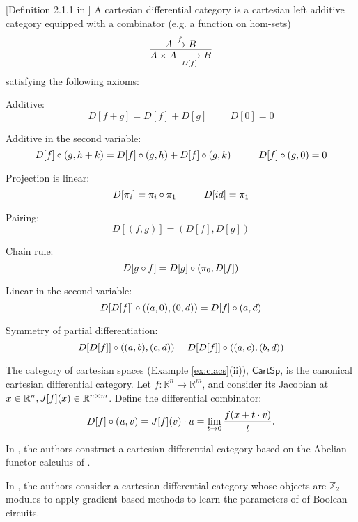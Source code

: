 \begin{definition}\label{def:cdc}[Definition 2.1.1 in \cite{Blute2009}]
    A cartesian differential category is a cartesian left additive category equipped with a combinator (e.g. a function on hom-sets)
    \[
        \infer{A \x A \xrightarrow[{D[f]}]{} B}{A \xrightarrow{f} B}
    \]
    satisfying the following axioms:
  \begin{enumerate}[{[CD.1]}]
      \item Additive:
        \[D[f+g] = D[f] + D[g] \hspace{1cm} D[0] = 0\]
      \item Additive in the second variable:
        \[D[f] \circ (g, h+k) = D[f]\circ (g,h) + D[f]\circ (g,k) \hspace{1cm} D[f] \circ (g,0) = 0\]
      \item Projection is linear:
        \[D[\pi_i] =  \pi_i \circ \pi_1 \hspace{1cm} D[id] = \pi_1\]
      \item Pairing:
        \[D[(f,g)] = (D[f],D[g])\]
      \item Chain rule:
        \[D[g\circ f] = D[g] \circ (\pi_0, D[f])\]
      \item Linear in the second variable:
        \[D[D[f]] \circ ((a,0),(0,d)) = D[f] \circ (a,d)\]
      \item Symmetry of partial differentiation:
        \[D[D[f]] \circ ((a,b),(c,d)) = D[D[f]] \circ ((a,c),(b,d))\]
  \end{enumerate}
\end{definition}
\begin{example}
    The category of cartesian spaces (Example \ref{ex:clacs}(ii)), $\mathsf{CartSp}$, is the canonical cartesian differential category. Let $f: \mathbb{R}^n \to \mathbb{R}^m $, and consider its Jacobian at $x \in \mathbb{R}^n , J[f](x) \in \mathbb{R}^{n \times m}$.  Define the differential combinator:
	    \[
	        D[f]\circ (u,v) = J[f](v) \cdot u = \lim_{t \to 0} \frac{f(x + t\cdot v)}{t}.
	    \]
	\item In \cite{Bauer2016}, the authors construct a cartesian differential category based on the Abelian functor calculus of \cite{MR1451606}.
	\item In \cite{wilson2021reverse}, the authors consider a cartesian differential category whose objects are $\mathbb{Z}_2$-modules to apply gradient-based methods to learn the parameters of of Boolean circuits. 
\end{example}
